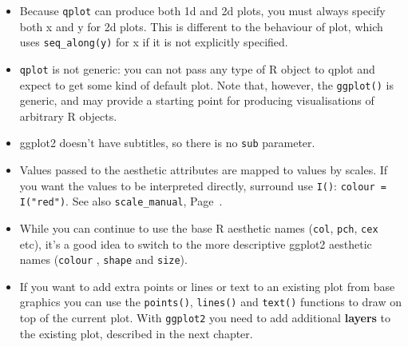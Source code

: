 \begin{itemize}
  \item Because {\tt qplot} can produce both 1d and 2d plots, you must always specify both x and y for 2d plots.  This is different to the behaviour of plot, which uses {\tt seq\_along(y)} for x if it is not explicitly specified.
  
  \item {\tt qplot} is not generic: you can not pass any type of R object to qplot and expect to get some kind of default plot.  Note that, however, the {\tt ggplot()} is generic, and may provide a starting point for producing visualisations of arbitrary R objects.
  
  \item ggplot2 doesn't have subtitles, so there is no {\tt sub} parameter.    
  
  \item Values passed to the aesthetic attributes are mapped to values by scales.  If you want the values to be interpreted directly, surround use {\tt I()}: {\tt colour = I("red")}.  See also {\tt scale\_manual}, Page~\pageref{sec:scale_special}.
  
  \item While you can continue to use the base R aesthetic names ({\tt col},  {\tt pch}, {\tt cex} etc), it's a good idea to switch to the more descriptive ggplot2 aesthetic names ({\tt colour} , {\tt shape} and {\tt size}).

  \item If you want to add extra points or lines or text to an existing plot from base graphics you can use the {\tt points()}, {\tt lines()} and {\tt text()} functions to draw on top of the current plot.  With {\tt ggplot2} you need to add additional {\bf layers} to the existing plot, described in the next chapter.
  
\end{itemize}


